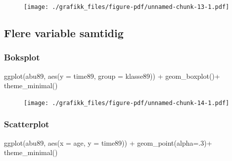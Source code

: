 \documentclass[
  letterpaper,
  DIV=11,
  numbers=noendperiod]{scrreprt}
\newenvironment{Shaded}{\begin{snugshade}}{\end{snugshade}}
\newcommand{\AttributeTok}[1]{\textcolor[rgb]{0.40,0.45,0.13}{#1}}
\newcommand{\DecValTok}[1]{\textcolor[rgb]{0.68,0.00,0.00}{#1}}
\newcommand{\FunctionTok}[1]{\textcolor[rgb]{0.28,0.35,0.67}{#1}}
\newcommand{\NormalTok}[1]{\textcolor[rgb]{0.00,0.23,0.31}{#1}}
\newcommand{\SpecialCharTok}[1]{\textcolor[rgb]{0.37,0.37,0.37}{#1}}
\theoremstyle{definition}
\theoremstyle{remark}
\begin{document}
\begin{figure}[H]

{\centering \texttt{[image: ./grafikk\_files/figure-pdf/unnamed-chunk-13-1.pdf]}

}

\end{figure}

\hypertarget{flere-variable-samtidig}{%
\subsection{Flere variable samtidig}\label{flere-variable-samtidig}}

\hypertarget{boksplot}{%
\subsubsection{Boksplot}\label{boksplot}}

\begin{Shaded}
\begin{Highlighting}[]
\FunctionTok{ggplot}\NormalTok{(abu89, }\FunctionTok{aes}\NormalTok{(}\AttributeTok{y =}\NormalTok{ time89, }\AttributeTok{group =}\NormalTok{ klasse89)) }\SpecialCharTok{+}
  \FunctionTok{geom\_boxplot}\NormalTok{()}\SpecialCharTok{+}
  \FunctionTok{theme\_minimal}\NormalTok{()}
\end{Highlighting}
\end{Shaded}

\begin{figure}[H]

{\centering \texttt{[image: ./grafikk\_files/figure-pdf/unnamed-chunk-14-1.pdf]}

}

\end{figure}

\hypertarget{scatterplot}{%
\subsubsection{Scatterplot}\label{scatterplot}}

\begin{Shaded}
\begin{Highlighting}[]
\FunctionTok{ggplot}\NormalTok{(abu89, }\FunctionTok{aes}\NormalTok{(}\AttributeTok{x =}\NormalTok{ age, }\AttributeTok{y =}\NormalTok{ time89)) }\SpecialCharTok{+}
  \FunctionTok{geom\_point}\NormalTok{(}\AttributeTok{alpha=}\NormalTok{.}\DecValTok{3}\NormalTok{)}\SpecialCharTok{+}
  \FunctionTok{theme\_minimal}\NormalTok{()}
\end{Highlighting}
\end{Shaded}
\end{document}

